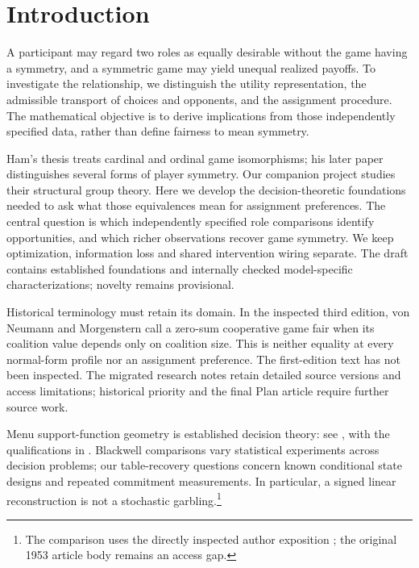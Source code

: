 \section{Introduction}
A participant may regard two roles as equally desirable without the game
having a symmetry, and a symmetric game may yield unequal realized payoffs.
To investigate the relationship, we distinguish the utility representation,
the admissible transport of choices and opponents, and the assignment procedure.
The mathematical objective is to derive implications from those independently
specified data, rather than define fairness to mean symmetry.

Ham's thesis \citep{hamthesis} treats cardinal and ordinal game isomorphisms;
his later paper \citep{ham2021} distinguishes several forms of player symmetry.
Our companion project studies their structural group theory. Here we develop
the decision-theoretic foundations needed to ask what those equivalences mean
for assignment preferences. The central question is which independently specified role comparisons
identify opportunities, and which richer observations recover game symmetry.
We keep optimization, information loss and shared intervention wiring
separate. The draft contains established foundations and internally checked
model-specific characterizations; novelty remains provisional.

Historical terminology must retain its domain. In the inspected third edition,
von Neumann and Morgenstern \citep[\S28]{vnm1953} call a zero-sum cooperative
game fair when its coalition value depends only on coalition size. This is
neither equality at every normal-form profile nor an assignment preference.
The first-edition text has not been inspected. The migrated research notes
retain detailed source versions and access limitations; historical priority
and the final Plan article require further source work.

Menu support-function geometry is established decision theory: see
\citet[Section 4]{dlr2001}, with the qualifications in
\citet{dlrs2007}. Blackwell comparisons vary statistical experiments across
decision problems; our table-recovery questions concern known conditional
state designs and repeated commitment measurements. In particular, a signed
linear reconstruction is not a stochastic garbling.\footnote{The comparison
uses the directly inspected author exposition \citet{borgers2023}; the
original 1953 article body remains an access gap.}
